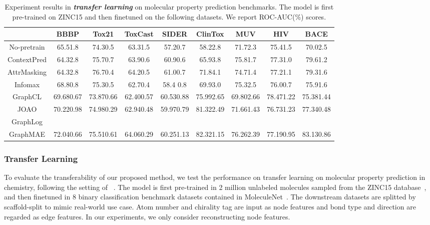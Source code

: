 {\begin{table*}[htp]
\caption{\textmd{Experiment results in \textbf{\textit{transfer learning}} on molecular property prediction benchmarks. The model is first pre-trained on ZINC15 and then finetuned on the following datasets. We report ROC-AUC(\%) scores.}}
\label{tab:mol_clf}
\renewcommand\tabcolsep{6pt}
\begin{tabular}{c|cccccccc}
\toprule[1.2pt]
                        & BBBP       & Tox21      & ToxCast    & SIDER      & ClinTox    & MUV        & HIV        & BACE       \\
\midrule
    No-pretrain         & 65.51.8   & 74.30.5   & 63.31.5   & 57.20.7   & 58.22.8   & 71.72.3   & 75.41.5   & 70.02.5   \\
    ContextPred         & 64.32.8   & 75.70.7   & 63.90.6   & 60.90.6   & 65.93.8   & 75.81.7   & 77.31.0   & 79.61.2   \\
    AttrMasking         & 64.32.8   & 76.70.4   & 64.20.5   & 61.00.7   & 71.84.1   & 74.71.4   & 77.21.1   & 79.31.6   \\
    Infomax             & 68.80.8  & 75.30.5  & 62.70.4  & 58.4 0.8  & 69.93.0  & 75.32.5  & 76.00.7  & 75.91.6  \\
GraphCL             & 69.680.67 & 73.870.66 & 62.400.57 & 60.530.88 & 75.992.65 & 69.802.66 & 78.471.22 & 75.381.44 \\
    JOAO                & 70.220.98 & 74.980.29 & 62.940.48 & 59.970.79 & 81.322.49 & 71.661.43 & 76.731.23 & 77.340.48 \\
GraphLog \\ 
\midrule
GraphMAE        & 72.040.66 & 75.510.61 & 64.060.29 & 60.251.13 & 82.321.15 & 76.262.39 & 77.190.95 & 83.130.86 \\
\bottomrule[1.2pt]
\end{tabular}
\end{table*}





\subsubsection{Transfer Learning}\hfill



 To evaluate the transferability of our proposed method, we test the performance on transfer learning on molecular property prediction in chemistry, following the setting of ~\cite{hu2020strategies,you2020graph,you2021graph}. The model is first pre-trained in  2 million unlabeled molecules sampled from the ZINC15 database~\cite{sterling2015zinc}, and then finetuned in 8 binary classification benchmark datasets contained in MoleculeNet~\cite{wu2018moleculenet}. The downstream datasets are splitted by scaffold-split to mimic real-world use case.  Atom number and chirality tag are input as node features and bond type and direction are regarded as edge features. In our experiments, we only consider reconstructing node features.

}
